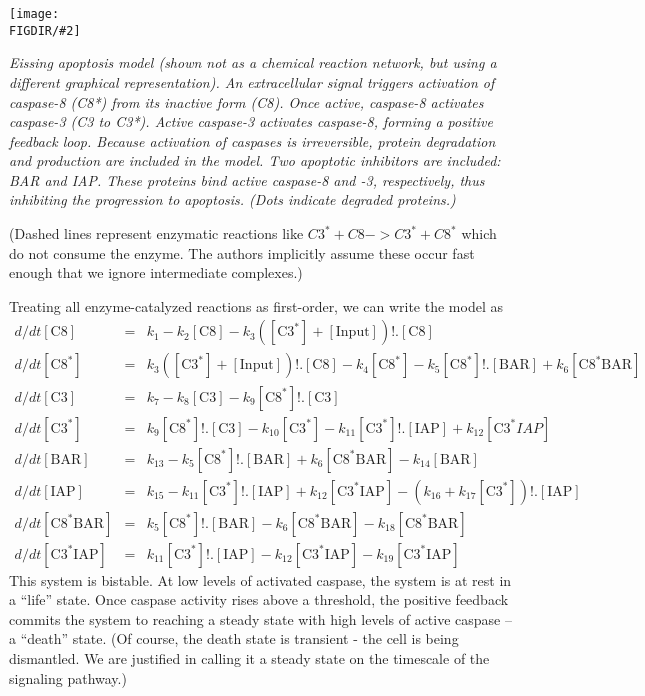 \documentclass[12pt]{article}
\newcommand{\pic}[2]{\texttt{[image: \\FIGDIR/\#2]}}
\newcommand{\picc}[2]{\centerline{\pic{#1}{#2}}}
\newcommand{\beqn}{\begin{eqnarray*}}
\newcommand{\eeqn}{\end{eqnarray*}}
\newcommand{\tim}{} %
\begin{document}
\picc{0.3}{fig615_ingalls_apoptosis.png}

\emph{Eissing apoptosis model (shown not as a chemical reaction network, but 
using a different graphical representation). An extracellular signal triggers
  activation of 
  caspase-8 (C8*) from its inactive form (C8). Once active, caspase-8
  activates caspase-3 (C3 to C3*). Active caspase-3 activates caspase-8,
  forming a positive feedback loop. Because activation of caspases is
  irreversible, protein degradation and production are included in the
  model. Two apoptotic inhibitors are included: BAR and IAP. These proteins
  bind active caspase-8 and -3, respectively, thus inhibiting the progression
  to apoptosis. (Dots indicate degraded proteins.)}


(Dashed lines represent enzymatic reactions like $C3^*+C8 -> C3^* + C8^*$ which
do not consume the enzyme.  The authors implicitly assume these
occur fast enough that we ignore intermediate complexes.)

Treating all enzyme-catalyzed reactions as first-order, we can write the model
as
\beqn
d/dt[\mbox{C8}]\tim &=& 
k_{1}- 
k_{2}[\mbox{C8}]\tim - 
k_{3}([\mbox{C3} ^* ]\tim +
[\mbox{Input}]\tim )!.[\mbox{C8}]\tim 
\\
d/dt[\mbox{C8} ^* ]\tim &=&
k_{3}([\mbox{C3} ^* ]\tim +
[\mbox{Input}]\tim )!.[\mbox{C8}]\tim - 
k_{4}[\mbox{C8} ^* ]\tim - 
k_{5}[\mbox{C8} ^* ]\tim !.[\mbox{BAR}]\tim +
k_{6}[\mbox{C8} ^* \mbox{BAR}]\tim  
\\
d/dt[\mbox{C3}]\tim &=& 
k_{7}- 
k_{8}[\mbox{C3}]\tim - 
k_{9}[\mbox{C8} ^* ]\tim !.[\mbox{C3}]\tim 
\\
d/dt[\mbox{C3} ^* ]\tim &=&
k_{9}[\mbox{C8} ^* ]\tim !.[\mbox{C3}]\tim - 
k_{10}[\mbox{C3} ^* ]\tim - 
k_{11}[\mbox{C3} ^* ]\tim !.[\mbox{IAP}]\tim +
k_{12}[\mbox{C3} ^* IAP]\tim 
\\
d/dt[\mbox{BAR}]\tim &=& k_{13}-
k_{5}[\mbox{C8} ^* ]\tim !.[\mbox{BAR}]\tim +
k_{6}[\mbox{C8} ^* \mbox{BAR}]\tim -
k_{14}[\mbox{BAR}]\tim 
\\
d/dt[\mbox{IAP}]\tim &=& k_{15}-
k_{11}[\mbox{C3} ^* ]\tim !.[\mbox{IAP}]\tim +
k_{12}[\mbox{C3} ^* \mbox{IAP}]\tim - 
(k_{16}+
k_{17}[\mbox{C3} ^* ]\tim )!.[\mbox{IAP}]\tim 
\\
d/dt[\mbox{C8} ^* \mbox{BAR}]\tim  &=& 
k_{5}[\mbox{C8} ^* ]\tim !.[\mbox{BAR}]\tim - 
k_{6}[\mbox{C8} ^* \mbox{BAR}]\tim- 
k_{18}[\mbox{C8} ^* \mbox{BAR}]\tim 
\\
d/dt[\mbox{C3} ^* \mbox{IAP}]\tim &=&
k_{11}[\mbox{C3} ^* ]\tim !.[\mbox{IAP}]\tim - 
k_{12}[\mbox{C3} ^* \mbox{IAP}]\tim - 
k_{19}[\mbox{C3} ^* \mbox{IAP}]\tim 
\eeqn
This system is bistable. At low levels of activated caspase, the system is at
rest in a ``life'' state.  Once caspase activity rises above a threshold, the
positive feedback commits the system to reaching a steady state with high
levels of active caspase -- a ``death'' state. (Of course, the death state is
transient - the cell is being dismantled. We are justified in calling it a
steady state on the timescale of the signaling pathway.)
\end{document}
